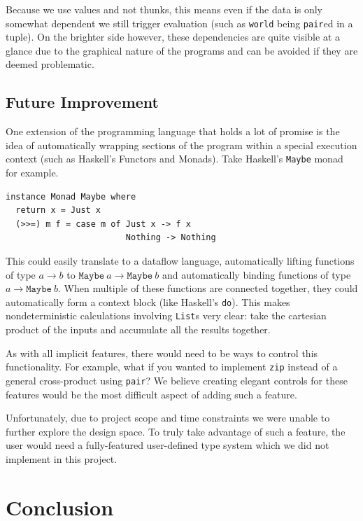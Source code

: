 \documentclass[12pt,UTF8,a4]{article}
\newcommand{\code}[1]{\texttt{#1}}
\newcommand{\type}[1]{\texttt{#1}}
\begin{document}
Because we use values and not thunks, this means even if the data is
only somewhat dependent we still trigger evaluation (such as
\type{world} being \code{pair}ed in a tuple). On the brighter side
however, these dependencies are quite visible at a glance due to the
graphical nature of the programs and can be avoided if they are deemed
problematic.

\subsection{Future Improvement}
One extension of the programming language that holds a lot of promise
is the idea of automatically wrapping sections of the program within a
special execution context (such as Haskell's Functors and
Monads). Take Haskell's \code{Maybe} monad for example.
\begin{center}
\begin{verbatim}
instance Monad Maybe where
  return x = Just x
  (>>=) m f = case m of Just x -> f x
                        Nothing -> Nothing
\end{verbatim}
\end{center}

This could easily translate to a dataflow language, automatically
lifting functions of type $a \rightarrow b$ to $\type{Maybe}\ a
\rightarrow \type{Maybe}\ b$ and automatically binding functions of
type $a \rightarrow \type{Maybe}\ b$. When multiple of these functions
are connected together, they could automatically form a context block
(like Haskell's \code{do}). This makes nondeterministic calculations
involving \code{List}s very clear: take the cartesian product of the inputs and accumulate all the results together.

As with all implicit features, there would need to be ways to control
this functionality. For example, what if you wanted to implement
\code{zip} instead of a general cross-product using \code{pair}? We
believe creating elegant controls for these features would be the most
difficult aspect of adding such a feature.

Unfortunately, due to project scope and time constraints we were
unable to further explore the design space. To truly take advantage of
such a feature, the user would need a fully-featured user-defined type
system which we did not implement in this project.




\section{Conclusion}
\end{document}
